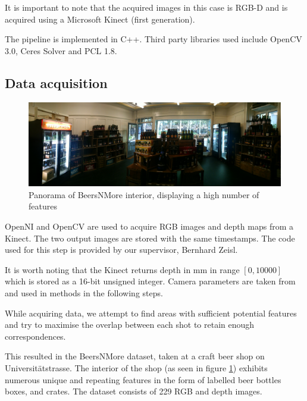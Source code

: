 \documentclass[10pt,twocolumn,letterpaper]{article}
\begin{document}
It is important to note that the acquired images in this case is RGB-D and is
acquired using a Microsoft Kinect (first generation).

The pipeline is implemented in C++. Third party libraries used include OpenCV
3.0, Ceres Solver and PCL 1.8.


\subsection{Data acquisition}
\begin{figure}
\begin{center}
   \includegraphics[width=0.9\linewidth]{figures/BeersNMore_panorama.jpg}
\end{center}
\caption{Panorama of BeersNMore interior, displaying a high number of features}
\label{fig:panorama}
\end{figure}
OpenNI and OpenCV are used to acquire RGB images and depth maps from a Kinect.
The two output images are stored with the same timestamps. The code used for
this step is provided by our supervisor, Bernhard Zeisl.

It is worth noting that the Kinect returns depth in mm in range $[0, 10000]$
which is stored as a 16-bit unsigned integer. Camera parameters are taken from
\cite{smisek20133d} and used in methods in the following steps.

While acquiring data, we attempt to find areas with sufficient potential
features and try to maximise the overlap between each shot to retain enough
correspondences.

This resulted in the BeersNMore dataset, taken at a craft beer shop on
Universit\"atstrasse. The interior of the shop (as seen in figure \ref{fig:panorama}) exhibits
numerous unique and repeating features in the form of labelled beer bottles
boxes, and crates. The dataset consists of 229 RGB and depth images.



\end{document}
